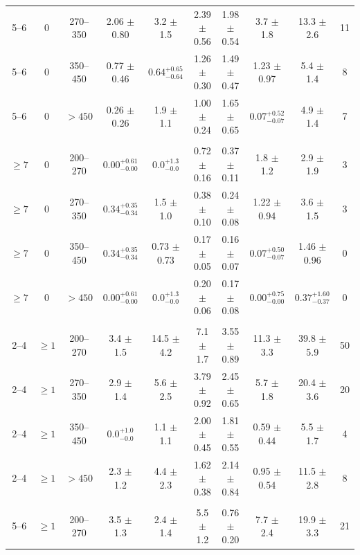 \begin{table}[h!]
\begin{tabular}{cccccccccc}
5--6     & 0  & 270--350     & 2.06 $\pm$ 0.80       & 3.2  $\pm$ 1.5        & 2.39 $\pm$ 0.56& 1.98 $\pm$ 0.54      & 3.7  $\pm$ 1.8        & 13.3 $\pm$ 2.6        & 11  \\
5--6     & 0  & 350--450     & 0.77 $\pm$ 0.46       & $0.64_{-0.64}^{+0.65}$& 1.26 $\pm$ 0.30& 1.49 $\pm$ 0.47      & 1.23 $\pm$ 0.97       & 5.4 $\pm$ 1.4         & 8 \\
5--6     & 0  & ${>}450$     & 0.26 $\pm$ 0.26       & 1.9 $\pm$ 1.1         & 1.00 $\pm$ 0.24& 1.65 $\pm$ 0.65      & $0.07_{-0.07}^{+0.52}$& 4.9 $\pm$ 1.4         & 7 \\
\\ %
${\geq}7$& 0  & 200--270     & $0.00_{-0.00}^{+0.61}$& $0.0_{-0.0}^{+1.3}$   & 0.72 $\pm$ 0.16& 0.37 $\pm$ 0.11      & 1.8 $\pm$ 1.2         & 2.9 $\pm$ 1.9         & 3 \\
${\geq}7$& 0  & 270--350     & $0.34_{-0.34}^{+0.35}$& 1.5 $\pm$ 1.0         & 0.38 $\pm$ 0.10& 0.24 $\pm$ 0.08      & 1.22 $\pm$ 0.94       & 3.6 $\pm$ 1.5         & 3 \\
${\geq}7$& 0  & 350--450     & $0.34_{-0.34}^{+0.35}$& 0.73 $\pm$ 0.73       & 0.17 $\pm$ 0.05& 0.16 $\pm$ 0.07      & $0.07_{-0.07}^{+0.50}$& 1.46 $\pm$ 0.96       & 0 \\
${\geq}7$& 0  & ${>}450$     & $0.00_{-0.00}^{+0.61}$& $0.0_{-0.0}^{+1.3}$   & 0.20 $\pm$ 0.06& 0.17 $\pm$ 0.08      & $0.00_{-0.00}^{+0.75}$& $0.37_{-0.37}^{+1.60}$& 0 \\
\\ %
2--4     & ${\geq}1$  & 200--270     & 3.4  $\pm$ 1.5        & 14.5 $\pm$ 4.2        & 7.1  $\pm$ 1.7 & 3.55 $\pm$ 0.89      & 11.3 $\pm$ 3.3        & 39.8  $\pm$ 5.9       & 50 \\
2--4     & ${\geq}1$  & 270--350     & 2.9  $\pm$ 1.4        & 5.6  $\pm$ 2.5        & 3.79 $\pm$ 0.92& 2.45 $\pm$ 0.65      & 5.7  $\pm$ 1.8        & 20.4  $\pm$ 3.6       & 20   \\
2--4     & ${\geq}1$  & 350--450     & $0.0_{-0.0}^{+1.0}$   & 1.1 $\pm$ 1.1         & 2.00 $\pm$ 0.45& 1.81 $\pm$ 0.55      & 0.59 $\pm$ 0.44       & 5.5  $\pm$ 1.7        & 4  \\
2--4     & ${\geq}1$  & ${>}450$     & 2.3 $\pm$ 1.2         & 4.4 $\pm$ 2.3         & 1.62 $\pm$ 0.38& 2.14 $\pm$ 0.84      & 0.95 $\pm$ 0.54       & 11.5 $\pm$ 2.8        & 8  \\
\\ %
5--6     & ${\geq}1$  & 200--270     & 3.5  $\pm$ 1.3        & 2.4  $\pm$ 1.4        & 5.5  $\pm$ 1.2 & 0.76 $\pm$ 0.20      & 7.7  $\pm$ 2.4        & 19.9  $\pm$ 3.3       & 21 \\

\end{tabular}
\end{table}
